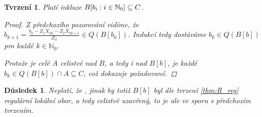 \documentclass[11pt,a4paper]{article}
\newcommand\m[1]{\mathbb { #1 }} %
\newcommand\N{\m N}
\newcounter{numb}
\theoremstyle{definition}
\theoremstyle{plain}
\newtheorem{tvrzeni}[numb]{Tvrzení}
\newtheorem{dusledek}[numb]{Důsledek}
\begin{document}
\begin{tvrzeni}
	Platí inkluze $\Ball \subseteq C$.

	\begin{proof}
		Z předchozího pozorování vidíme, že $b_{k + 1} = \frac{b_k - Z_1 X_{2k} - Z_2 X_{2k + 1}}{Z_3} \in Q(B[b_k])$. Indukcí tedy dostáváme $b_k \in Q(B[b])$ pro každé $k \in \N_0$.

		Protože je celé $A$ celistvé nad $B$, a tedy i nad $B[b]$, je každé $b_k \in Q(B[b]) \cap A \subseteq C$, což dokazuje požadované.
	\end{proof}
\end{tvrzeni}

\begin{dusledek}
	Neplatí, že , jinak by totiž $B[b]$ byl dle tvrzení \ref{thm:R_reg} regulární lokální obor, a tedy celistvě uzavřený, to je ale ve sporu s předchozím tvrzením.
\end{dusledek}
\end{document}
